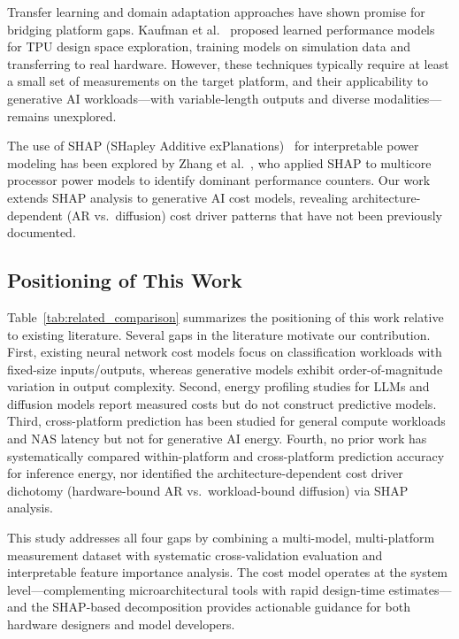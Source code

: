 \documentclass{ieeeaccess}
\begin{document}
Transfer learning and domain adaptation approaches have shown promise for bridging platform gaps.
Kaufman et al.~\cite{kaufman2021learned} proposed learned performance models for TPU design space exploration, training models on simulation data and transferring to real hardware.
However, these techniques typically require at least a small set of measurements on the target platform, and their applicability to generative AI workloads---with variable-length outputs and diverse modalities---remains unexplored.

The use of SHAP (SHapley Additive exPlanations)~\cite{lundberg2017shap} for interpretable power modeling has been explored by Zhang et al.~\cite{zhang2020shap}, who applied SHAP to multicore processor power models to identify dominant performance counters.
Our work extends SHAP analysis to generative AI cost models, revealing architecture-dependent (AR vs.\ diffusion) cost driver patterns that have not been previously documented.

\subsection{Positioning of This Work}
\label{sec:rw_positioning}

Table~\ref{tab:related_comparison} summarizes the positioning of this work relative to existing literature.
Several gaps in the literature motivate our contribution.
First, existing neural network cost models focus on classification workloads with fixed-size inputs/outputs, whereas generative models exhibit order-of-magnitude variation in output complexity.
Second, energy profiling studies for LLMs and diffusion models report measured costs but do not construct predictive models.
Third, cross-platform prediction has been studied for general compute workloads and NAS latency but not for generative AI energy.
Fourth, no prior work has systematically compared within-platform and cross-platform prediction accuracy for inference energy, nor identified the architecture-dependent cost driver dichotomy (hardware-bound AR vs.\ workload-bound diffusion) via SHAP analysis.

This study addresses all four gaps by combining a multi-model, multi-platform measurement dataset with systematic cross-validation evaluation and interpretable feature importance analysis.
The cost model operates at the system level---complementing microarchitectural tools with rapid design-time estimates---and the SHAP-based decomposition provides actionable guidance for both hardware designers and model developers.
\end{document}
